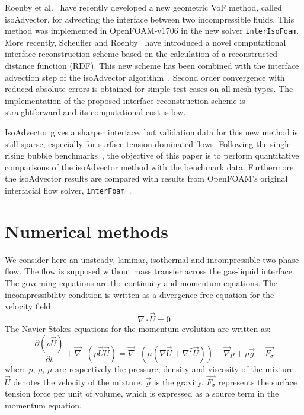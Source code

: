 \documentclass[review]{elsarticle}
\begin{document}
Roenby et al.~\cite{Roenby160405} have recently developed a new geometric VoF method, called isoAdvector, for advecting the interface between two incompressible fluids. This method was implemented in OpenFOAM-v1706 in the new solver \verb+interIsoFoam+. 
More recently, Scheufler and Roenby~\cite{Scheufler2018} have introduced a novel computational interface reconstruction scheme based on the calculation of a reconstructed distance function (RDF). This new scheme has been combined with the interface advection step of the isoAdvector algorithm~\cite{Scheufler2018}. Second order convergence with reduced absolute errors is obtained for simple test cases on all mesh types. The implementation of the proposed interface reconstruction scheme is straightforward and its computational cost is low. 

IsoAdvector gives a sharper interface, but validation data for this new method is still sparse, especially for surface tension dominated flows. Following the single rising bubble benchmarks~\cite{Hysing2009,Adelsberger2014}, the objective of this paper is to perform quantitative comparisons of the isoAdvector method with the benchmark data. Furthermore, the isoAdvector results are compared with results from OpenFOAM's original interfacial flow solver, \verb+interFoam+~\cite{Weller2008}.

\section{Numerical methods}\label{sec_nummethods}
We consider here an unsteady, laminar, isothermal and incompressible two-phase flow. The flow is supposed without mass transfer across the gas-liquid interface. The governing equations are the continuity and momentum equations. The incompressibility condition is written as a divergence free equation for the velocity field:
\begin{equation}
  \nabla \cdot \overrightarrow{U} = 0
\label{diveqn}
\end{equation}
The Navier-Stokes equations for the momentum evolution are written as: 
\begin{equation}
  \frac{\partial(\rho \overrightarrow{U})}{\partial t} + 
  \overrightarrow{\nabla} \cdot (\rho\overrightarrow{U}\overrightarrow{U}) = 
  \overrightarrow{\nabla} \cdot \left( \mu (\nabla\overrightarrow{U}+\nabla^T\overrightarrow{U})\right)
  - \overrightarrow{\nabla} p + \rho \overrightarrow{g} + \overrightarrow{F_{\sigma}}
\label{NSeqns}
\end{equation}
where $p$, $\rho$, $\mu$ are respectively the pressure, density and viscosity of the mixture. $\overrightarrow{U}$ denotes the velocity of the mixture. $\overrightarrow{g}$ is the gravity. $\overrightarrow{F_{\sigma}}$ represents the surface tension force per unit of volume, which is expressed as a source term in the momentum equation. 
\end{document}
